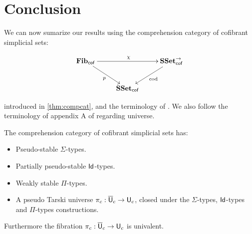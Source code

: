 \documentclass[reqno,10pt,a4paper,oneside,draft]{amsart}
\begin{document}
\section{Conclusion}
\label{sec:conclusion}

We can now sumarize our results using the comprehension category of cofibrant simplicial sets:

\[ \xymatrix{
\mathbf{Fib}_{ \mathsf{cof}} \ar[dr]_{p} \ar[rr]^{\chi} & & \SSet^{\to}_{\mathsf{cof}} \ar[dl]^{\mathrm{cod}} \\ 
 & \SSet_{\mathsf{cof}} &  }
 \]


introduced in \cref{thm:compcat}, and the terminology of \cite{LumsdaineP:locuoc}. We also follow the terminology of appendix A of \cite{ShulmanM:allths} regarding universe.

\begin{theorem} \label{th:main_ContextualCat}

The comprehension category of cofibrant simplicial sets has:

\begin{itemize}

\item Pseudo-stable $\Sigma$-types.

\item Partially pseudo-stable $\mathsf{Id}$-types.

\item Weakly stable $\Pi$-types.

\item A pseudo Tarski universe $\pi_c: \overline{\mathsf{U}}_c \rightarrow \mathsf{U}_c$, closed under the $\Sigma$-types, $\mathsf{Id}$-types and $\Pi$-types constructions.

\end{itemize}

Furthermore the fibration $\pi_c: \overline{\mathsf{U}}_c \rightarrow \mathsf{U}_c $ is univalent.

\end{theorem}
\end{document}
